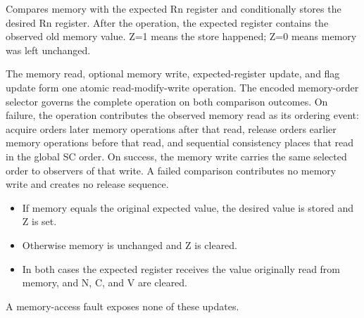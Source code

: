 Compares memory with the expected Rn register and conditionally stores the desired Rn register. After the operation, the expected register contains the observed old memory value. Z=1 means the store happened; Z=0 means memory was left unchanged.

The memory read, optional memory write, expected-register update, and flag update form one atomic read-modify-write operation.
The encoded memory-order selector governs the complete operation on both comparison outcomes. On failure, the
operation contributes the observed memory read as its ordering event: acquire orders later memory operations after
that read, release orders earlier memory operations before that read, and sequential consistency places that read in
the global SC order. On success, the memory write carries the same selected order to observers of that write. A
failed comparison contributes no memory write and creates no release sequence.

\begin{itemize}
\item If memory equals the original expected value, the desired value is stored and Z is set.
\item Otherwise memory is unchanged and Z is cleared.
\item In both cases the expected register receives the value originally read from memory, and N, C, and V are cleared.
\end{itemize}
A memory-access fault exposes none of these updates.
